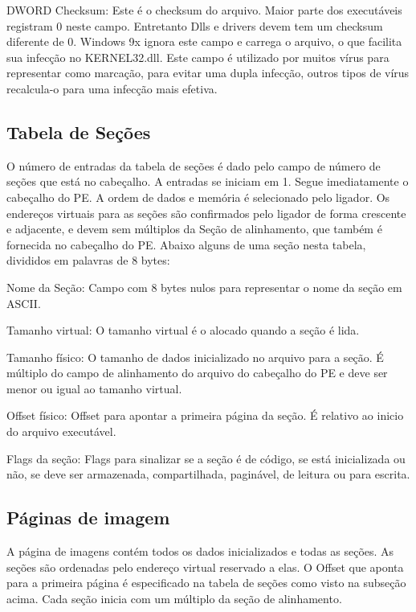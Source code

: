  DWORD Checksum: Este é o checksum do arquivo. Maior parte dos executáveis registram 0 neste campo. Entretanto Dlls e drivers devem tem um checksum diferente de 0. 
  Windows 9x ignora este campo e carrega o arquivo, o que facilita sua infecção no KERNEL32.dll. Este campo é utilizado por muitos vírus para representar como marcação, para evitar
  uma dupla infecção, outros tipos de vírus recalcula-o para uma infecção mais efetiva.

\subsection{Tabela de Seções}


O número de entradas da tabela de seções é dado pelo campo de número
de seções que está no cabeçalho. A entradas se iniciam em 1. Segue
imediatamente o cabeçalho do PE. A ordem de dados e memória é selecionado
pelo ligador. Os endereços virtuais para as seções são confirmados
pelo ligador de forma crescente e adjacente, e devem sem múltiplos
da Seção de alinhamento, que também é fornecida no cabeçalho do PE.
Abaixo alguns de uma seção nesta tabela, divididos em palavras de
8 bytes:


Nome da Seção: Campo com 8 bytes nulos para representar o nome da
seção em ASCII.


Tamanho virtual: O tamanho virtual é o alocado quando a seção é lida.


Tamanho físico: O tamanho de dados inicializado no arquivo para a
seção. É múltiplo do campo de alinhamento do arquivo do cabeçalho
do PE e deve ser menor ou igual ao tamanho virtual.


Offset físico: Offset para apontar a primeira página da seção. É relativo
ao inicio do arquivo executável.


Flags da seção: Flags para sinalizar se a seção é de código, se está
inicializada ou não, se deve ser armazenada, compartilhada, paginável,
de leitura ou para escrita.


\subsection{Páginas de imagem}


A página de imagens contém todos os dados inicializados e todas as
seções. As seções são ordenadas pelo endereço virtual reservado a
elas. O Offset que aponta para a primeira página é especificado na
tabela de seções como visto na subseção acima. Cada seção inicia com
um múltiplo da seção de alinhamento.


